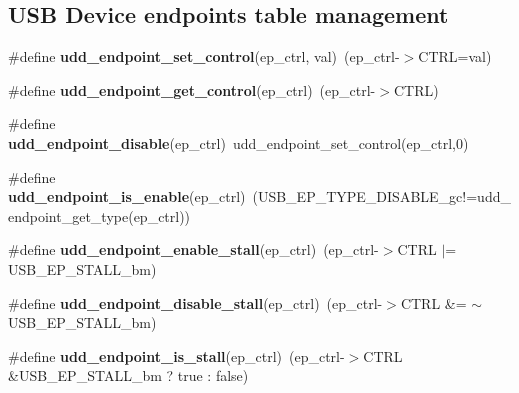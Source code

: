 \subsection*{U\-S\-B Device endpoints table management}
\begin{DoxyCompactItemize}
\item 
\hypertarget{group__udd__xmega__usb__group_ga657b3b38a6be5193260e83b106af74c8}{\#define {\bfseries udd\-\_\-endpoint\-\_\-set\-\_\-control}(ep\-\_\-ctrl, val)~(ep\-\_\-ctrl-\/$>$C\-T\-R\-L=val)}\label{group__udd__xmega__usb__group_ga657b3b38a6be5193260e83b106af74c8}

\item 
\hypertarget{group__udd__xmega__usb__group_ga2afc28726188976e0d2206c176ae8fbe}{\#define {\bfseries udd\-\_\-endpoint\-\_\-get\-\_\-control}(ep\-\_\-ctrl)~(ep\-\_\-ctrl-\/$>$C\-T\-R\-L)}\label{group__udd__xmega__usb__group_ga2afc28726188976e0d2206c176ae8fbe}

\item 
\hypertarget{group__udd__xmega__usb__group_ga61a7de0374644d6f85852a6ceda7d9d2}{\#define {\bfseries udd\-\_\-endpoint\-\_\-disable}(ep\-\_\-ctrl)~udd\-\_\-endpoint\-\_\-set\-\_\-control(ep\-\_\-ctrl,0)}\label{group__udd__xmega__usb__group_ga61a7de0374644d6f85852a6ceda7d9d2}

\item 
\hypertarget{group__udd__xmega__usb__group_ga784fb682f08b0b6b13a1447e3301715d}{\#define {\bfseries udd\-\_\-endpoint\-\_\-is\-\_\-enable}(ep\-\_\-ctrl)~(U\-S\-B\-\_\-\-E\-P\-\_\-\-T\-Y\-P\-E\-\_\-\-D\-I\-S\-A\-B\-L\-E\-\_\-gc!=udd\-\_\-endpoint\-\_\-get\-\_\-type(ep\-\_\-ctrl))}\label{group__udd__xmega__usb__group_ga784fb682f08b0b6b13a1447e3301715d}

\item 
\hypertarget{group__udd__xmega__usb__group_ga3a1639cbf97fc167a55930b116435314}{\#define {\bfseries udd\-\_\-endpoint\-\_\-enable\-\_\-stall}(ep\-\_\-ctrl)~(ep\-\_\-ctrl-\/$>$C\-T\-R\-L $|$= U\-S\-B\-\_\-\-E\-P\-\_\-\-S\-T\-A\-L\-L\-\_\-bm)}\label{group__udd__xmega__usb__group_ga3a1639cbf97fc167a55930b116435314}

\item 
\hypertarget{group__udd__xmega__usb__group_ga8561fda3e10485f6400c262733e88282}{\#define {\bfseries udd\-\_\-endpoint\-\_\-disable\-\_\-stall}(ep\-\_\-ctrl)~(ep\-\_\-ctrl-\/$>$C\-T\-R\-L \&= $\sim$U\-S\-B\-\_\-\-E\-P\-\_\-\-S\-T\-A\-L\-L\-\_\-bm)}\label{group__udd__xmega__usb__group_ga8561fda3e10485f6400c262733e88282}

\item 
\hypertarget{group__udd__xmega__usb__group_ga34128a4de7a3a56100b1d63b8bc96152}{\#define {\bfseries udd\-\_\-endpoint\-\_\-is\-\_\-stall}(ep\-\_\-ctrl)~(ep\-\_\-ctrl-\/$>$C\-T\-R\-L \&U\-S\-B\-\_\-\-E\-P\-\_\-\-S\-T\-A\-L\-L\-\_\-bm ? true \-: false)}\label{group__udd__xmega__usb__group_ga34128a4de7a3a56100b1d63b8bc96152}


\end{DoxyCompactItemize}
